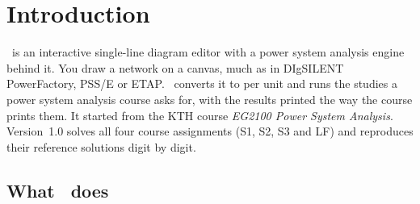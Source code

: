 \chapter{Introduction}\label{ch:introduction}

\app\ is an interactive single-line diagram editor with a power system analysis engine
behind it. You draw a network on a canvas, much as in DIgSILENT PowerFactory, PSS/E or
ETAP. \app\ converts it to per unit and runs the studies a power system analysis course
asks for, with the results printed the way the course prints them. It started from the
KTH course \emph{EG2100 Power System Analysis}. Version~1.0 solves all four course
assignments (S1, S2, S3 and LF) and reproduces their reference solutions digit by digit.

\section{What \app\ does}

